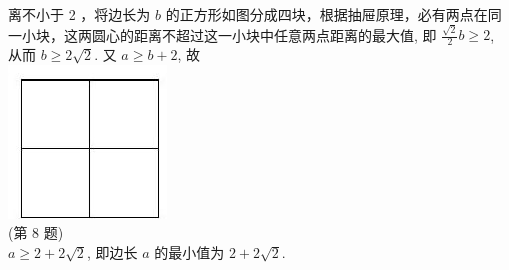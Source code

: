 \documentclass[10pt]{article}
\begin{document}
离不小于 2 ，将边长为 $b$ 的正方形如图分成四块，根据抽屉原理，必有两点在同一小块，这两圆心的距离不超过这一小块中任意两点距离的最大值, 即 $\frac{\sqrt{2}}{2} b \geqslant 2$, 从而 $b \geqslant 2 \sqrt{2}$. 又 $a \geqslant b+2$, 故\\
\includegraphics[max width=\textwidth, center]{2024_10_30_66b8e5e701da2093c133g-093(2)}\\
(第 8 题)\\
$a \geqslant 2+2 \sqrt{2}$, 即边长 $a$ 的最小值为 $2+2 \sqrt{2}$.
\end{document}

